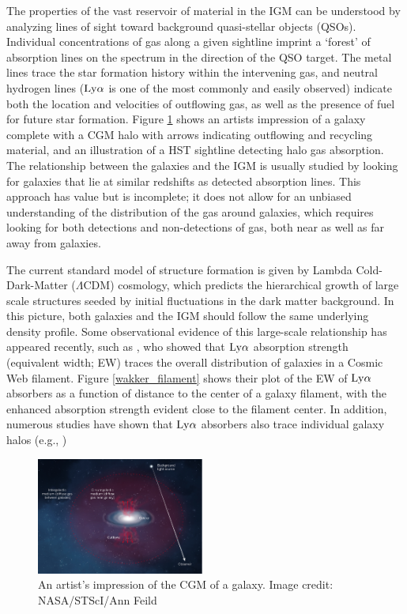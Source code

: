 \documentclass[twocolumn,tighten]{aastex62}
\begin{document}
The properties of the vast reservoir of material in the IGM can be understood by analyzing lines of sight toward background quasi-stellar objects (QSOs). Individual concentrations of gas along a given sightline imprint a `forest' of absorption lines on the spectrum in the direction of the QSO target. The metal lines trace the star formation history within the intervening gas, and neutral hydrogen lines ($\rm Ly\alpha$ is one of the most commonly and easily observed) indicate both the location and velocities of outflowing gas, as well as the presence of fuel for future star formation. Figure \ref{cgm_artist} shows an artists impression of a galaxy complete with a CGM halo with arrows indicating outflowing and recycling material, and an illustration of a HST sightline detecting halo gas absorption. The relationship between the galaxies and the IGM is usually studied by looking for galaxies that lie at similar redshifts as detected absorption lines. This approach has value but is incomplete; it does not allow for an unbiased understanding of the distribution of the gas around galaxies, which requires looking for both detections and non-detections of gas, both near as well as far away from galaxies.

The current standard model of structure formation is given by Lambda Cold-Dark-Matter ($\Lambda$CDM) cosmology, which predicts the hierarchical growth of large scale structures seeded by initial fluctuations in the dark matter background. In this picture, both galaxies and the IGM should follow the same underlying density profile. Some observational evidence of this large-scale relationship has appeared recently, such as \cite{wakker2015}, who showed that $\rm Ly\alpha$ absorption strength (equivalent width; EW) traces the overall distribution of galaxies in a Cosmic Web filament. Figure \ref{wakker_filament} shows their plot of the EW of $\rm Ly\alpha$ absorbers as a function of distance to the center of a galaxy filament, with the enhanced absorption strength evident close to the filament center. In addition, numerous studies have shown that $\rm Ly\alpha$ absorbers also trace individual galaxy halos (e.g., \citealt{wakker2009, danforth2016, stocke2013, liang2014, lanzetta1995, chen1998, chen2001a, tripp1998, steidel2010, prochaska2011, thom2012})


\begin{figure}[ht!]
        \centering
        \vspace{0pt}
        \includegraphics[width=0.49\textwidth]{cgm_nature.jpg}
        \caption{\small{An artist's impression of the CGM of a galaxy. Image credit: NASA/STScI/Ann Feild}}
        \vspace{5pt}
        \label{cgm_artist}
\end{figure}
\end{document}

